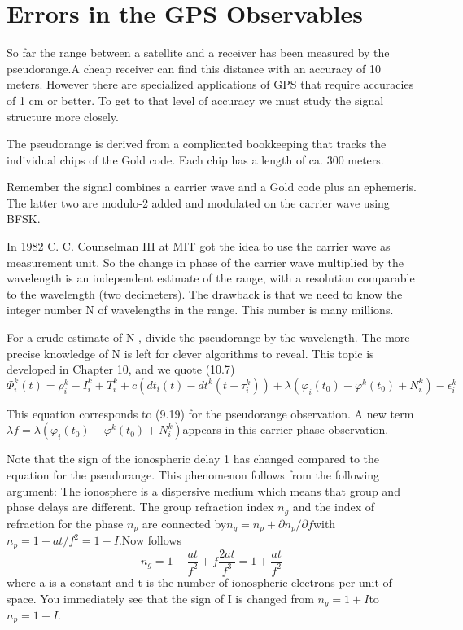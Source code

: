 \section{Errors in the GPS Observables}
	So far the range between a satellite and a receiver has been measured by the pseudorange.A cheap receiver can find this distance with an accuracy of 10 meters. However there are specialized applications of GPS that require accuracies of 1 cm or better. To get to that level of accuracy we must study the signal structure more closely.
	
	The pseudorange is derived from a complicated bookkeeping that tracks the individual chips of the Gold code. Each chip has a length of ca. 300 meters.
	
	Remember the signal combines a carrier wave and a Gold code plus an ephemeris. The latter two are modulo-2 added and modulated on the carrier wave using BFSK.
	
	In 1982 C. C. Counselman III at MIT got the idea to use the carrier wave as measurement unit. So the change in phase of the carrier wave multiplied by the wavelength is an independent estimate of the range, with a resolution comparable to the wavelength (two decimeters). The drawback is that we need to know the integer number N of wavelengths in the range. This number is many millions.
	
	For a crude estimate of N , divide the pseudorange by the wavelength. The more 	precise knowledge of N is left for clever algorithms to reveal. This topic is developed in 	Chapter 10, and we quote (10.7)
	\begin{equation}\label{eq:9.33}
		\Phi^k_i(t) = \rho^k_i-I^k_i+T^k_i+c(dt_i(t)-dt^k(t-\tau^k_i))+\lambda(\varphi_i(t_0)-\varphi^k(t_0)+N^k_i)-\epsilon^k_i
	\end{equation}

	This equation corresponds to (9.19) for the pseudorange observation. A new term$\lambda f=\lambda(\varphi_i(t_0)-\varphi^k(t_0)+N^k_i)$appears in this carrier phase observation.
	
	Note that the sign of the ionospheric delay 1 has changed compared to the equation for the pseudorange. This phenomenon follows from the following argument: The ionosphere is a dispersive medium which means that group and phase delays are different. The group refraction index $n_g$ and the index of refraction for the phase $n_p$ are connected by$n_g=n_p+\partial n_p/\partial f$with $n_p=1-at/f^2=1-I$.Now follows
	\[
		n_g = 1-\dfrac{at}{f^2}+f\dfrac{2at}{f^3}=1+\dfrac{at}{f^2}
	\]
	where a is a constant and t is the number of ionospheric electrons per unit of space. You immediately see that the sign of I is changed from $n_g=1+I$to$n_p=1-I$.
	
